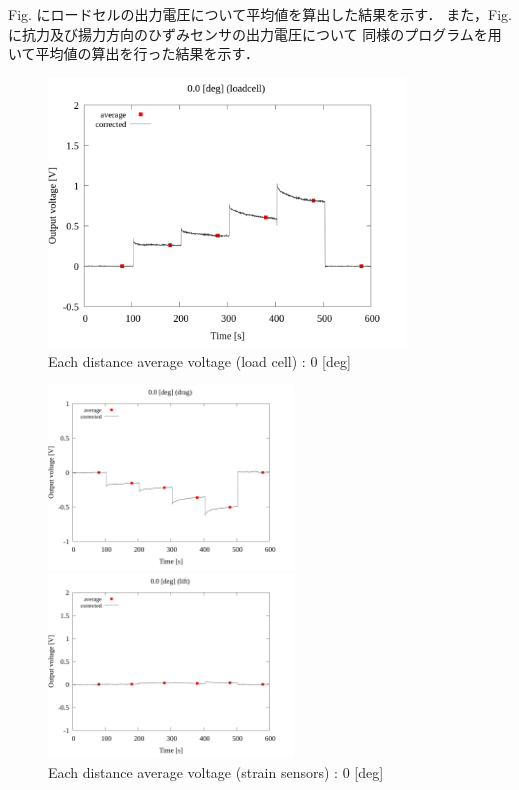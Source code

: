 Fig. にロードセルの出力電圧について平均値を算出した結果を示す．
また，Fig.に抗力及び揚力方向のひずみセンサの出力電圧について
同様のプログラムを用いて平均値の算出を行った結果を示す．

\begin{figure}[htbp]
  \footnotesize
  \begin{center}
    \includegraphics[width=95mm]{../../02_workspace/result/2-1/plot/03-1_loadcell/03_loadcell_average_0.png}
    \caption{Each distance average voltage (load cell) : 0 [deg]}
  \end{center}
\end{figure}

\begin{figure}[htbp]
  \begin{minipage}[b]{0.45\linewidth}
    \centering
    \includegraphics[width=65mm]{../../02_workspace/result/2-1/plot/03-2_drag/03_drag_average_0.png}
  \end{minipage}
  \begin{minipage}[b]{0.45\linewidth}
    \centering
    \includegraphics[width=65mm]{../../02_workspace/result/2-1/plot/03-3_lift/03_lift_average_0.png}
  \end{minipage}
  \caption{Each distance average voltage (strain sensors) : 0 [deg]}
\end{figure}

